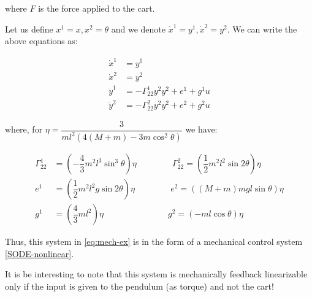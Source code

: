 where $F$ is the force applied to the cart.

Let us define $x^1 = x, x^2 = \theta$ and we denote $\dot{x}^1 = y^1, \dot{x}^2 = y^2$. We can write the above equations as:

\begin{equation}
    \label{eq:mech-ex}
    \begin{split}
        \dot{x}^1 &= y^1 \\
        \dot{x}^2 &= y^2 \\
        \dot{y}^1 &= -\Gamma_{22}^1 y^2 y^2 + e^1 + g^1 u \\
        \dot{y}^2 &= -\Gamma_{22}^2 y^2 y^2 + e^2 + g^2 u
    \end{split}
\end{equation}

where, for $\eta = \dfrac{3}{ml^2 \left(4(M + m) - 3m \cos^2{\theta} \right)}$ we have:

\begin{equation*}
    \begin{split}
        \Gamma_{22}^1 &= \left(-\dfrac{4}{3} m^2 l^3 \sin^3{\theta}\right)\eta \hspace{50pt} \Gamma_{22}^2 = \left(\dfrac{1}{2} m^2 l^2 \sin{2\theta}\right) \eta \\
        e^1 &= \left(\dfrac{1}{2} m^2 l^2 g \sin{2\theta}\right) \eta \hspace{50pt} e^2 = \left( (M + m) mgl \sin{\theta} \right) \eta \\
        g^1 &= \left(\dfrac{4}{3} ml^2 \right) \eta \hspace{90pt} g^2 = \left( - ml \cos{\theta} \right) \eta 
    \end{split}
\end{equation*}

Thus, this system in \eqref{eq:mech-ex} is in the form of a mechanical control system \eqref{SODE-nonlinear}.

It is be interesting to note that this system is mechanically feedback linearizable only if the input is given to the pendulum (as torque) and not the cart!